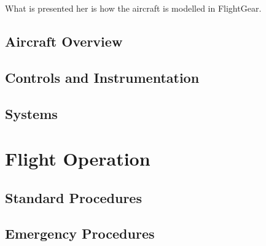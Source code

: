 What is presented her is how the aircraft is modelled in FlightGear.

\chapter{Aircraft Overview}
\chapter{Controls and Instrumentation}
\chapter{Systems}



\part{Flight Operation}
\chapter{Standard Procedures}
\chapter{Emergency Procedures}
